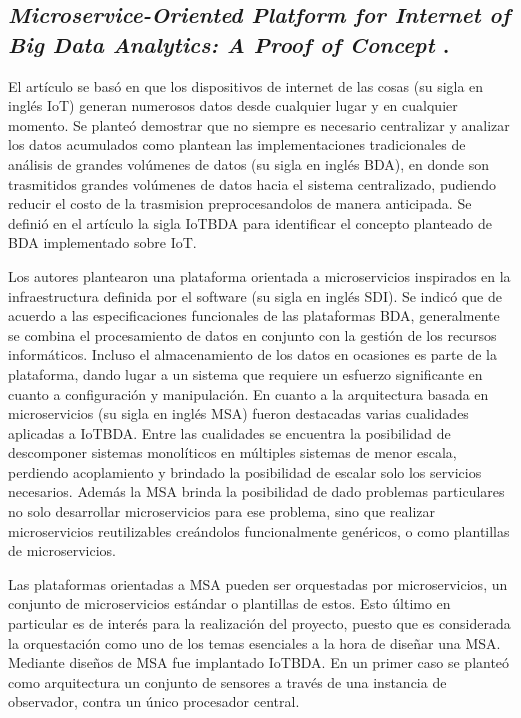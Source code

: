 \subsection{\textbf{
        \emph{ Microservice-Oriented Platform for Internet of Big Data Analytics: A Proof of Concept }
    } \cite{li_microservice-oriented_2019}.
}

El artículo se basó en que los dispositivos de internet de las cosas (su sigla en inglés IoT) generan numerosos datos desde cualquier lugar y en cualquier momento. Se planteó demostrar que no siempre es necesario centralizar y analizar los datos acumulados como plantean las implementaciones tradicionales de análisis de grandes volúmenes de datos (su sigla en inglés BDA), en donde son trasmitidos grandes volúmenes de datos hacia el sistema centralizado, pudiendo reducir el costo de la trasmision preprocesandolos de manera anticipada. Se definió en el artículo la sigla IoTBDA para identificar el concepto planteado de BDA implementado sobre IoT.\par

Los autores plantearon una plataforma orientada a microservicios inspirados en la infraestructura definida por el software (su sigla en inglés SDI).
Se indicó que de acuerdo a las especificaciones funcionales de las plataformas BDA, generalmente se combina el procesamiento de datos en conjunto con la gestión de los recursos informáticos. Incluso el almacenamiento de los datos en ocasiones es parte de la plataforma, dando lugar a un sistema que requiere un esfuerzo significante en cuanto a configuración y manipulación.
En cuanto a la arquitectura basada en microservicios (su sigla en inglés MSA) fueron destacadas varias cualidades aplicadas a IoTBDA. Entre las cualidades se encuentra la posibilidad de descomponer sistemas monolíticos en múltiples sistemas de menor escala, perdiendo acoplamiento y brindado la posibilidad de escalar solo los servicios necesarios. Además la MSA brinda la posibilidad de dado problemas particulares no solo desarrollar microservicios para ese problema, sino que realizar microservicios reutilizables creándolos funcionalmente genéricos, o como plantillas de microservicios.\par

Las plataformas orientadas a MSA pueden ser orquestadas por microservicios, un conjunto de microservicios estándar o plantillas de estos. Esto último en particular es de interés para la realización del proyecto, puesto que es considerada la orquestación como uno de los temas esenciales a la hora de diseñar una MSA. Mediante diseños de MSA fue implantado IoTBDA. En un primer caso se planteó como arquitectura un conjunto de sensores a través de una instancia de observador, contra un único procesador central.\par

